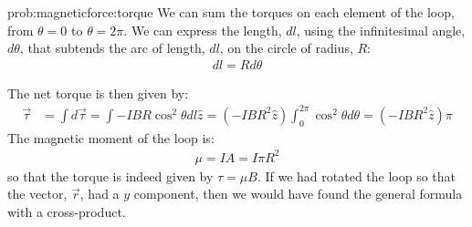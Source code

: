 \begin{solution}{prob:magneticforce:torque}
We can sum the torques on each element of the loop, from $\theta = 0$ to $\theta=2\pi$. We can express the length, $dl$, using the infinitesimal angle, $d\theta$, that subtends the arc of length, $dl$, on the circle of radius, $R$:
\begin{align*}
dl = Rd\theta
\end{align*}

The net torque is then given by:
\begin{align*}
\vec \tau &= \int d\vec \tau=\int -IBR\cos^2\theta dl \hat z= (-IBR^2\hat z)\int_0^{2\pi} \cos^2\theta d\theta =(-IBR^2\hat z)\pi
\end{align*}
The magnetic moment of the loop is:
\begin{align*}
\mu = IA = I\pi R^2
\end{align*}
so that the torque is indeed given by $\tau = \mu B$. If we had rotated the loop so that the vector, $\vec r$, had a $y$ component, then we would have found the general formula with a cross-product.
\end{solution}





